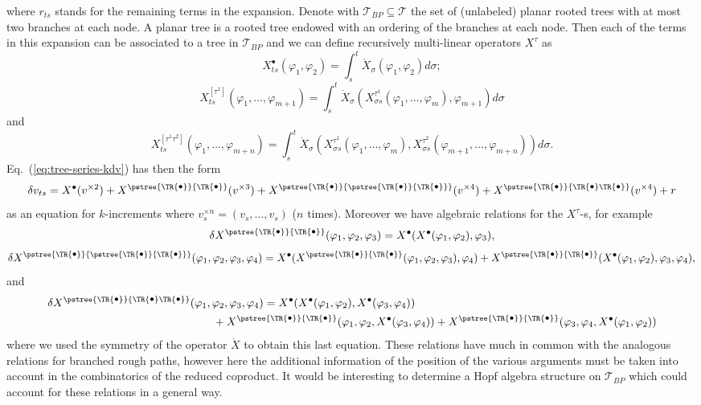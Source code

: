 \documentclass[a4paper,11pt,reqno]{article}
\newcommand{\1}{{\bf 1}}
\newcommand{\der}{\delta}
\newcommand{\TT}{\mathcal{T}}
\newcommand{\troot}{\bullet}
\newcommand{\tsnode}{\TR{\raisebox{0.5pt}{\ensuremath{\scriptstyle\bullet}}}}
\newcommand{\tsroot}{\ensuremath{\scriptstyle\bullet}}
\newcommand{\aaabbb}{\pstree{\tsnode}{\pstree{\tsnode}{\tsnode}}}
\newcommand{\aabb}{\pstree{\tsnode}{\tsnode}}
\newcommand{\aababb}{\pstree{\tsnode}{\tsnode \tsnode}}
\newcommand{\smalltrees}{\psset{levelsep=-5pt,nodesep=-2pt,treesep=1pt}}
\begin{document}
where $r_{ts}$ stands for the remaining terms in
the expansion. Denote with $\TT_{BP}\subseteq \TT$ the set of (unlabeled) planar rooted
trees with at most two branches at each node. A planar tree is a
rooted tree endowed with an ordering of the branches at each node. 
Then each of the terms in this expansion can be associated
to a tree in $\TT_{BP}$  and we can define recursively
multi-linear operators $X^{\tau}$ as
$$
X^{\troot}_{ts}(\varphi_1,\varphi_2) = \int_s^t \dot
X_\sigma(\varphi_1,\varphi_2) d\sigma;
$$ 
$$
X^{[\tau^1]}_{ts}(\varphi_1,\dots,\varphi_{m+1}) = \int_s^t \dot
X_\sigma(X^{\tau^1}_{\sigma
  s}(\varphi_1,\dots,\varphi_m),\varphi_{m+1})
 d\sigma
$$
and
$$
X^{[\tau^1 \tau^2]}_{ts}(\varphi_1,\dots,\varphi_{m+n}) = \int_s^t \dot
X_\sigma(X^{\tau^1}_{\sigma s}(\varphi_1,\dots,\varphi_m),X^{\tau^2}_{\sigma s}(\varphi_{m+1},\dots,\varphi_{m+n})) d\sigma.
$$
Eq.~(\ref{eq:tree-series-kdv}) has then the form
\smalltrees
\begin{equation}
  \label{eq:kdv-incr-1}
\der v_{ts} = X^{\tsroot}(v^{\times 2}) + X^{\aabb}(v^{\times 3}) +
X^{\aaabbb}(v^{\times 4}) +  X^{\aababb}(v^{\times 4}) +r  
\end{equation}
as an equation for $k$-increments where $v^{\times n}_s =
(v_s,\dots,v_s)$ ($n$ times). Moreover we have algebraic relations for
the $X^\tau$-s, for example
$$
\der X^{\aabb}(\varphi_1,\varphi_2,\varphi_3) = X^{\tsroot}(X^{\tsroot}(\varphi_1,\varphi_2),\varphi_3) ,
$$
$$
\der X^{\aaabbb}(\varphi_1,\varphi_2,\varphi_3,\varphi_4) =
X^{\tsroot}(X^{\aabb}(\varphi_1,\varphi_2,\varphi_3),\varphi_4) + X^{\aabb}(X^{\tsroot}(\varphi_1,\varphi_2),\varphi_3,\varphi_4) ,
$$
and
\begin{equation*}
  \begin{split}
\der X^{\aababb}& (\varphi_1,\varphi_2,\varphi_3,\varphi_4) =
X^{\tsroot}(X^{\tsroot}(\varphi_1,\varphi_2),X^{\tsroot}(\varphi_3,\varphi_4))
\\ & \qquad +
X^{\aabb}(\varphi_1,\varphi_2,X^{\tsroot}(\varphi_3,\varphi_4)) + 
X^{\aabb}(\varphi_3,\varphi_4,X^{\tsroot}(\varphi_1,\varphi_2))    
  \end{split}
\end{equation*}
where we used the symmetry of the operator $\dot X$ to obtain this
last equation. These relations have much in common with the analogous
relations for branched rough paths, however here the additional
information of the position of the various arguments must be taken
into account in the combinatorics of the reduced coproduct. It would
be interesting to determine  a Hopf algebra structure  on $\TT_{BP}$
which could account for these
relations in a general way. 
\end{document}
